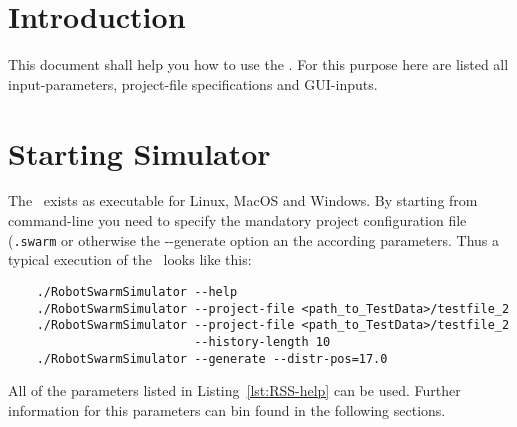 \documentclass[a4paper,halfparskip,11pt,twoside]{scrartcl}
\begin{document}
\init{}


\section{Introduction}
This document shall help you how to use the \RSS. For this purpose here are listed all input-parameters, project-file specifications and GUI-inputs.

\section{Starting Simulator}
The \RSS\ exists as executable for Linux, MacOS and Windows. By starting from command-line you need to specify the mandatory project configuration file ({\tt *.swarm} or otherwise the {\ttfamily -{}-generate} option an the according parameters. Thus a typical execution of the \RSS\ looks like this:
\begin{verbatim}
    ./RobotSwarmSimulator --help
    ./RobotSwarmSimulator --project-file <path_to_TestData>/testfile_2
    ./RobotSwarmSimulator --project-file <path_to_TestData>/testfile_2 
                          --history-length 10
    ./RobotSwarmSimulator --generate --distr-pos=17.0
\end{verbatim}


All of the parameters listed in Listing~\ref{lst:RSS-help} can be used. Further information for this parameters can bin found in the following sections.
\end{document}
